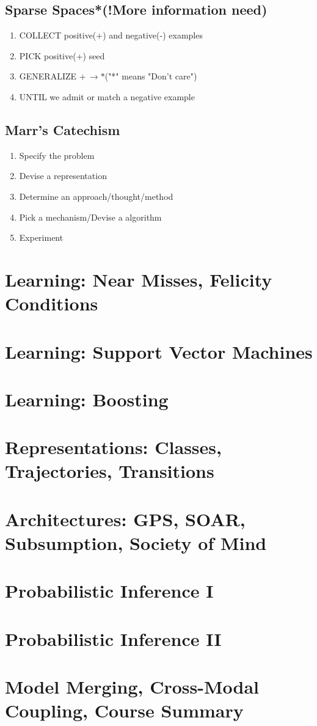 \documentclass[12pt]{book}
\begin{document}
\subsection{Sparse Spaces*(!More information need)}
\begin{enumerate}
	\item COLLECT positive(+) and negative(-) examples
	\item PICK positive(+) seed
	\item GENERALIZE $+\,\longrightarrow *$("*" means "Don't care")
	\item UNTIL we admit or match a negative example
\end{enumerate}
\subsection{Marr's Catechism}
\begin{enumerate}
	\item Specify the problem
	\item Devise a representation
	\item Determine an approach/thought/method
	\item Pick a mechanism/Devise a algorithm
	\item Experiment 
\end{enumerate}
\newpage
\section{Learning: Near Misses, Felicity Conditions}

\newpage
\section{Learning: Support Vector Machines}

\newpage
\section{Learning: Boosting}

\newpage
\section{Representations: Classes, Trajectories, Transitions}

\newpage
\section{Architectures: GPS, SOAR, Subsumption, Society of Mind}

\newpage
\section{Probabilistic Inference I}

\newpage
\section{Probabilistic Inference II}

\newpage
\section{Model Merging, Cross-Modal Coupling, Course Summary}
\end{document}
